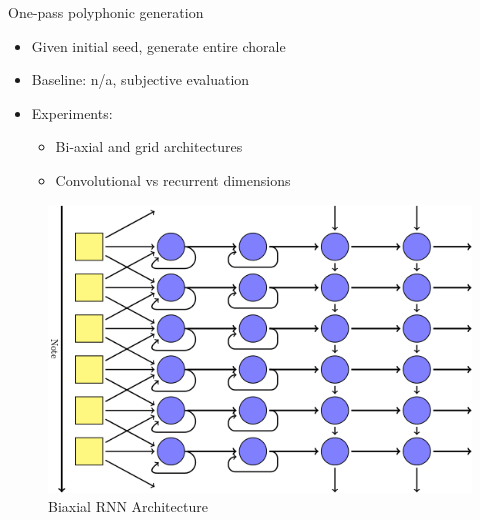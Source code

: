 \documentclass[final]{beamer}
\newlength{\onecolwid}
\newlength{\twocolwid}
\begin{document}
\begin{frame}[t]
\begin{columns}[t]
\begin{column}{\twocolwid}





\begin{columns}[t,totalwidth=\twocolwid] %

\begin{column}{\onecolwid} %


\begin{block}{One-pass polyphonic generation}
  \begin{itemize}
    \item Given initial seed, generate entire chorale
    \item Baseline: n/a, subjective evaluation
    \item Experiments:
      \begin{itemize}
        \item Bi-axial and grid architectures
        \item Convolutional vs recurrent dimensions
      \end{itemize}
  \end{itemize}
\end{block}

\begin{figure}
  \includegraphics[width=0.95\linewidth]{biaxial.png}
  \caption{Biaxial RNN Architecture\cite{colah:lstm}}
\end{figure}


\end{column}
\end{columns}
\end{column}
\end{columns}
\end{frame}
\end{document}

